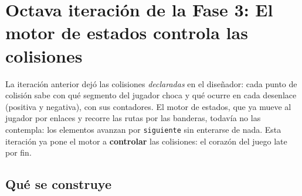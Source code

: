 \section{Octava iteración de la Fase 3: El motor de estados controla las colisiones}
\label{sec:MotorColisiones}

La iteración anterior dejó las colisiones \emph{declaradas} en el diseñador: cada
punto de colisión sabe con qué segmento del jugador choca y qué ocurre en cada
desenlace (positiva y negativa), con sus contadores. El motor de estados, que ya
mueve al jugador por enlaces y recorre las rutas por las banderas, todavía no las
contempla: los elementos avanzan por \texttt{siguiente} sin enterarse de nada. Esta
iteración ya pone el motor a \textbf{controlar} las colisiones: el corazón del juego late por fin.

\subsection{Qué se construye}
\label{subsec:QueSeConstruyeF3I8}

